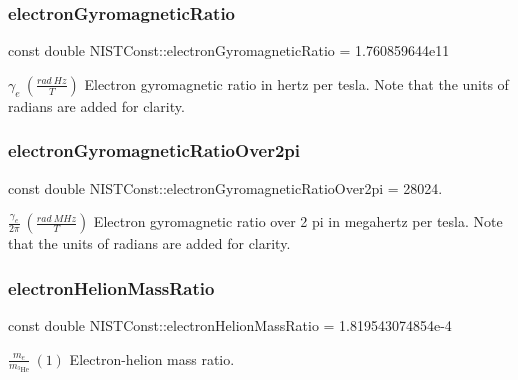 \subsubsection{\texorpdfstring{electron\+Gyromagnetic\+Ratio}{electronGyromagneticRatio}}
{\footnotesize\ttfamily const double N\+I\+S\+T\+Const\+::electron\+Gyromagnetic\+Ratio = 1.\+760859644e11}

$\gamma_e \ (\frac{rad\ Hz}{T})$ Electron gyromagnetic ratio in hertz per tesla. Note that the units of radians are added for clarity. \mbox{\label{group___electron_ga67e6ebbd2c2d8043cbdb09979dc7247b}} 
\subsubsection{\texorpdfstring{electron\+Gyromagnetic\+Ratio\+Over2pi}{electronGyromagneticRatioOver2pi}}
{\footnotesize\ttfamily const double N\+I\+S\+T\+Const\+::electron\+Gyromagnetic\+Ratio\+Over2pi = 28024.}

$\frac{\gamma_e}{2\pi} \ (\frac{rad\ MHz}{T})$ Electron gyromagnetic ratio over 2 pi in megahertz per tesla. Note that the units of radians are added for clarity. \mbox{\label{group___electron_ga5039598cd8a51d15d9dfbb0463c109d6}} 
\subsubsection{\texorpdfstring{electron\+Helion\+Mass\+Ratio}{electronHelionMassRatio}}
{\footnotesize\ttfamily const double N\+I\+S\+T\+Const\+::electron\+Helion\+Mass\+Ratio = 1.\+819543074854e-\/4}

$\frac{m_e}{m_{^3\textrm{He}}} \ (1)$ Electron-\/helion mass ratio. \mbox{\label{group___electron_ga81fc83bd665b7b4fb83e9901ed7d6628}} 

